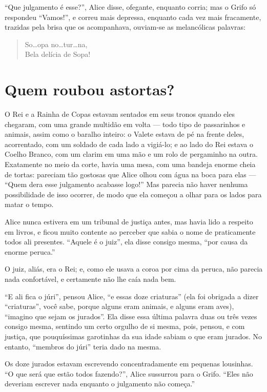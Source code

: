 ``Que julgamento é esse?'', Alice disse, ofegante, enquanto corria; mas o
Grifo só respondeu ``Vamos!'', e correu mais depressa, enquanto cada
vez mais fracamente, trazidas pela brisa que os acompanhava, ouviam-se as
melancólicas palavras:

\begin{quote}
So\ldots{}opa no\ldots{}tur\ldots{}na,\\
Bela delícia de Sopa!
\end{quote}

\quebra\chapter[Quem roubou as tortas?]{Quem roubou as\break tortas?}

O Rei e a Rainha de Copas estavam sentados em seus tronos quando eles
chegaram, com uma grande multidão em volta --- todo tipo de passarinhos e
animais, assim como o baralho inteiro: o Valete estava de pé na frente
deles, acorrentado, com um soldado de cada lado a vigiá-lo; e ao lado do
Rei estava o Coelho Branco, com um clarim em uma mão e um rolo de
pergaminho na outra. Exatamente no meio da corte, havia uma mesa, com
uma bandeja enorme cheia de tortas: pareciam tão gostosas que Alice
olhou com água na boca para elas --- ``Quem dera esse julgamento acabasse
logo!'' Mas parecia não haver nenhuma possibilidade de isso ocorrer, de
modo que ela começou a olhar para os lados para matar o tempo.

Alice nunca estivera em um tribunal de justiça antes, mas havia lido a
respeito em livros, e ficou muito contente ao perceber que sabia o nome
de praticamente todos ali presentes. ``Aquele é o juiz'', ela disse
consigo mesma, ``por causa da enorme peruca.''

O juiz, aliás, era o Rei; e, como ele usava a coroa por cima da peruca,
não parecia nada confortável, e certamente não lhe caía nada bem.

``E ali fica o júri'', pensou Alice, ``e essas doze criaturas'' (ela foi
obrigada a dizer ``criaturas'', você sabe, porque alguns eram animais, e
alguns eram aves), ``imagino que sejam os jurados''. Ela disse essa
última palavra duas ou três vezes consigo mesma, sentindo um certo
orgulho de si mesma, pois, pensou, e com justiça, que pouquíssimas
garotinhas da sua idade sabiam o que eram jurados. No entanto, ``membros
do júri'' teria dado na mesma.

Os doze jurados estavam escrevendo concentradamente em pequenas
lousinhas. ``O que será que estão todos fazendo?'', Alice sussurrou para
o Grifo. ``Eles não deveriam escrever nada enquanto o julgamento não
começa.''

